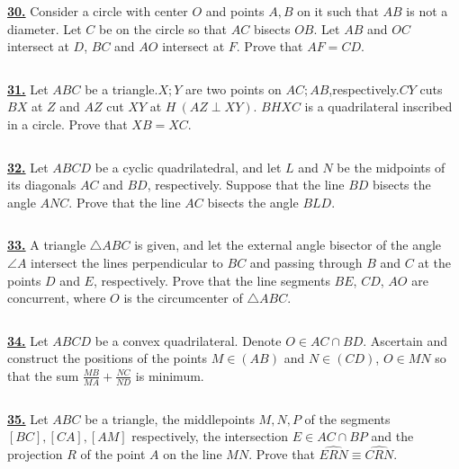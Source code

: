 \documentclass{article}
\begin{document}
$$ $$

\href{http://www.artofproblemsolving.com/Forum/viewtopic.php?p=1004026#p1004026
 }{\bf 30.} Consider a circle with center $O$ and points $A,B$ on it such that $AB$ is not a diameter. Let $C$ be on the circle so that $AC$ bisects $OB.$ Let $AB$ and $OC$ intersect at $D$, $BC$ and $AO$ intersect at $F.$ Prove that $AF=CD.$




$$ $$

\href{ http://www.artofproblemsolving.com/Forum/viewtopic.php?p=962592#p962592
}{\bf 31.}  Let $ ABC$ be a triangle.$ X;Y$ are two points on $ AC;AB$,respectively.$ CY$ cuts $ BX$ at $ Z$ and $ AZ$ cut $ XY$ at $ H \ (AZ \perp XY)$. $ BHXC$ is a quadrilateral inscribed in a circle.
Prove that $ XB=XC.$



$$ $$

\href{ http://www.artofproblemsolving.com/Forum/viewtopic.php?p=22914#p22914
}{\bf 32.} Let $ABCD$ be a cyclic quadrilatedral, and let $L$ and $N$ be the midpoints of its diagonals $AC$ and $BD$, respectively. Suppose that the line $BD$ bisects the angle $ANC$. Prove that the line $AC$ bisects the angle $BLD$.



$$ $$

\href{http://www.artofproblemsolving.com/Forum/viewtopic.php?p=868538#p868538
 }{\bf 33.} A triangle $\triangle ABC$ is given, and let the external angle bisector of the angle $\angle A$ intersect the lines perpendicular to $BC$ and passing through $B$ and $C$ at the points $D$ and $E$, respectively. Prove that the line segments $BE$, $CD$, $AO$ are concurrent, where $O$ is the circumcenter of $\triangle ABC$.



$$ $$

\href{http://www.artofproblemsolving.com/Forum/viewtopic.php?p=727178#p727178}{\bf 34.} Let $ABCD$ be a convex quadrilateral. Denote $O\in AC\cap BD$. Ascertain and construct the positions of the points $M\in (AB)$ and $N\in (CD)$, $O\in MN$ so that the sum $\frac{MB}{MA}+\frac{NC}{ND}$ is minimum.



$$ $$

\href{ http://www.artofproblemsolving.com/Forum/viewtopic.php?p=365242#p365242}{\bf 35.} Let $ABC$ be a triangle, the middlepoints $M,N,P$ of the segments $[BC],[CA],[AM]$ respectively, the intersection $E\in AC\cap BP$ and the projection $R$ of the point $A$ on the line $MN$. Prove that $\widehat {ERN}\equiv \widehat {CRN}$.
\end{document}
